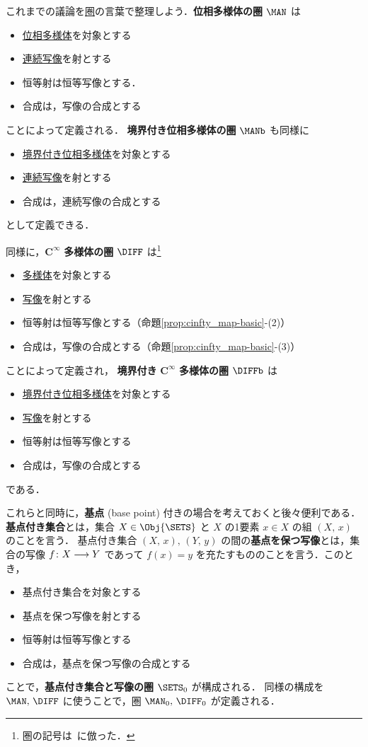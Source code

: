\documentclass[geometry_main]{subfiles}
\begin{document}
これまでの議論を\hyperref[def:category]{圏}の言葉で整理しよう．\textbf{位相多様体の圏} $\MAN$ は
\begin{itemize}\label{def:category-MAN}
	\item \hyperref[def.topomani]{位相多様体}を対象とする
	\item \hyperref[def.continuous]{連続写像}を射とする
	\item 恒等射は恒等写像とする．
	\item 合成は，写像の合成とする
\end{itemize}
ことによって定義される．
\textbf{境界付き位相多様体の圏} $\MANb$ も同様に
\begin{itemize}
	\item \hyperref[def:mani-with-boundary]{境界付き位相多様体}を対象とする
	\item \hyperref[def.continuous]{連続写像}を射とする
	\item 合成は，連続写像の合成とする
\end{itemize}
として定義できる．

同様に，$\bm{C^\infty}$ \textbf{多様体の圏} $\DIFF$ は\footnote{圏の記号は~\cite{Lee12}に倣った．}
\begin{itemize}\label{def:category-DIFF}
	\item \hyperref[diffmani]{\cinfty 多様体}を対象とする
	\item \hyperref[def.cinfty_mapping]{\cinfty 写像}を射とする
	\item 恒等射は恒等写像とする（命題\ref{prop:cinfty_map-basic}-(2)）
	\item 合成は，\cinfty 写像の合成とする（命題\ref{prop:cinfty_map-basic}-(3)）
\end{itemize}
ことによって定義され，
\textbf{境界付き} $\bm{C^\infty}$ \textbf{多様体の圏} $\DIFFb$ は
\begin{itemize}
	\item \hyperref[def:mani-with-boundary]{境界付き}\hyperref[diffmani]{位相多様体}を対象とする
	\item \hyperref[def.cinfty_mapping]{\cinfty 写像}を射とする
	\item 恒等射は恒等写像とする
	\item 合成は，写像の合成とする
\end{itemize}
である．

これらと同時に，\textbf{基点} (base point) 付きの場合を考えておくと後々便利である．
\textbf{基点付き集合}とは，集合 $X \in \Obj{\SETS}$ と $X$ の1要素 $x \in X$ の組 $(X,\, x)$ のことを言う．
基点付き集合 $(X,\, x),\, (Y,\, y)$ の間の\textbf{基点を保つ写像}とは，集合の写像 $f \colon X \longrightarrow Y$ であって $f(x) = y$ を充たすもののことを言う．このとき，
\begin{itemize}
	\item 基点付き集合を対象とする
	\item 基点を保つ写像を射とする
	\item 恒等射は恒等写像とする
	\item 合成は，基点を保つ写像の合成とする
\end{itemize}
ことで，\textbf{基点付き集合と写像の圏} $\SETS_0$ が構成される．
同様の構成を $\MAN,\, \DIFF$ に使うことで，圏 $\MAN_0,\, \DIFF_0$ が定義される．
\end{document}
